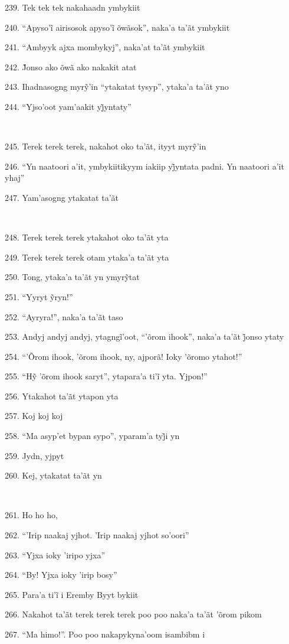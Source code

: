 239. Tek tek tek nakahaadn ymbykiit

240. ``Apyso’ĩ airisosok apyso’ĩ õwãsok'', naka’a ta’ãt ymbykiit

241. ``Ambyyk ajxa mombykyj'', naka'at ta'ãt ymbykiit

242. J̃onso ako õwã ako nakakit atat

243. Ihadnasogng myrỹ’in ``ytakatat tysyp'', ytaka’a ta’ãt yno

244. ``Yjso’oot yam’aakit yj̃yntaty''

~

245. Terek terek terek, nakahot oko ta’ãt, ityyt myrỹ’in

246. ``Yn naatoori a’it, ymbykiitikyym iakiip yj̃yntata padni. Yn naatoori a’it yhaj''

247. Yam'asogng ytakatat ta'ãt

~

248. Terek terek terek ytakahot oko ta'ãt yta

249. Terek terek terek otam ytaka'a ta'ãt yta

250. Tong, ytaka’a ta’ãt yn ymyrỹtat

251. ``Yyryt ỹryn!''

252. ``Ayryra!'', naka'a ta'ãt taso

253. Andyj andyj andyj, ytagngĩ’oot, ``’õrom ihook'', naka’a ta’ãt j̃onso ytaty

254. ``'Õrom ihook, 'õrom ihook, ny, ajporã! Ioky 'õromo ytahot!''

255. ``Hỹ ’õrom ihook saryt'', ytapara’a ti’ĩ yta. Yjpon!''

256. Ytakahot ta'ãt ytapon yta

257. Koj koj koj

258. ``Ma asyp’et bypan sypo'', yparam’a tyj̃i yn

259. Jydn, yjpyt

260. Kej, ytakatat ta'ãt yn

~

261. Ho ho ho,

262. ``'Irip naakaj yjhot. 'Irip naakaj yjhot so'oori''

263. ``Yjxa ioky 'iripo yjxa''

264. ``By! Yjxa ioky 'irip bosy''

265. Para’a ti’ĩ i Eremby Byyt bykiit

266. Nakahot ta'ãt terek terek terek poo poo naka'a ta'ãt 'õrom pikom

267. ``Ma himo!''. Poo poo nakapykyna'oom isambibm i

